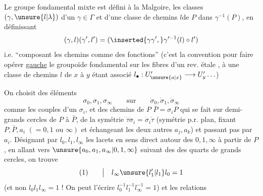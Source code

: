 Le groupe fondamental mixte est défini à la Malgoire,  les classes $(\gamma,\unsure{l|\lambda})$ d'un $\gamma\in\Gamma$ et d'une classe de chemins $l$\unsure{/|)}de $P$ dans $\gamma^{-1}(P)$, en définissant
\[
(\gamma,l)(\gamma',l')=(\inserted{\gamma\gamma',}\gamma'^{-1}(l)\circ l')
\]
i.e. ``composant les chemins comme des fonctions'' (c'est la convention pour faire opérer \uline{ gauche} le groupoïde fondamental sur les fibres d'un rev. étale , à une classe de chemins $l$ de $x$ à $y$ étant associé $l_\bullet:U'_{\unsure{a|x}}\longrightarrow U'_y\ldots$)

On choisit des éléments
\[
\sigma_0,\sigma_1,\sigma_\infty\qquad\text{sur}\qquad\dot\sigma_0,\dot\sigma_1,\dot\sigma_\infty
\]
comme les couples d'un $\sigma_i$, et des chemins  de $P$  $\bar P=\sigma_iP$ qui se fait sur   demi-grands cercles de $P$ à $\bar P$,    de la symétrie $\dot\tau\dot\sigma_i=\dot\sigma_i\dot\tau$ (symétrie p.r.  plan, fixant $P,\bar P,a_i$ $(=0,1\text{ ou }\infty)$ et échangeant les deux autres $a_j,a_k$) et  passant pas par $a_i$.  Désignant par $l_0,l_1,l_\infty$  les lacets en sens direct autour des $0,1,\infty$ à partir de $P$, en allant vers $\unsure{a_0,a_1,a_\infty|0,1,\infty}$ suivant des des quarts de grands cercles, on trouve
\[
(1)\qquad\big|\quad l_\infty\unsure{l'_1|l_1}l_0=1
\]
(et non $l_0l_1l_\infty=1$ !  On peut l'écrire $l_0^{-1}l_1^{-1}l_\infty^{-1}=1$)
et les relations
